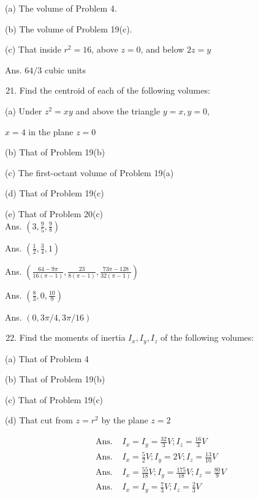\documentclass[10pt]{article}
\begin{document}
(a) The volume of Problem 4.

(b) The volume of Problem 19(c).

(c) That inside $r^{2}=16$, above $z=0$, and below $2 z=y$

Ans. $64 / 3$ cubic units

\begin{enumerate}
  \setcounter{enumi}{20}
  \item Find the centroid of each of the following volumes:
\end{enumerate}

(a) Under $z^{2}=x y$ and above the triangle $y=x, y=0$,

$x=4$ in the plane $z=0$

(b) That of Problem 19(b)

(c) The first-octant volume of Problem 19(a)

(d) That of Problem 19(c)

(e) That of Problem 20(c)\\
Ans. $\left(3, \frac{9}{5}, \frac{9}{8}\right)$

Ans. $\left(\frac{1}{2}, \frac{3}{4}, 1\right)$

Ans. $\left(\frac{64-9 \pi}{16(\pi-1)}, \frac{23}{8(\pi-1)}, \frac{73 \pi-128}{32(\pi-1)}\right)$

Ans. $\left(\frac{8}{3}, 0, \frac{10}{9}\right)$

Ans. $(0,3 \pi / 4,3 \pi / 16)$

\begin{enumerate}
  \setcounter{enumi}{21}
  \item Find the moments of inertia $I_{x}, I_{y}, I_{z}$ of the following volumes:
\end{enumerate}

(a) That of Problem 4

(b) That of Problem 19(b)

(c) That of Problem 19(c)

(d) That cut from $z=r^{2}$ by the plane $z=2$

$$
\begin{array}{ll}
\text { Ans. } & I_{x}=I_{y}=\frac{32}{3} V ; I_{z}=\frac{16}{3} V \\
\text { Ans. } & I_{x}=\frac{5}{2} V ; I_{y}=2 V ; I_{z}=\frac{13}{10} V \\
\text { Ans. } & I_{x}=\frac{55}{18} V ; I_{y}=\frac{175}{18} V ; I_{z}=\frac{80}{9} V \\
\text { Ans. } & I_{x}=I_{y}=\frac{7}{3} V ; I_{z}=\frac{2}{3} V
\end{array}
$$
\end{document}
